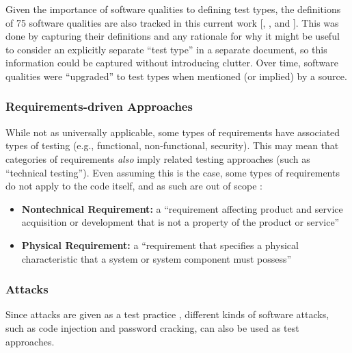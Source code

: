 Given the importance of software qualities to defining test types, the
definitions of 75 software qualities are also tracked in this current work%
[, , and ].
This was done by capturing their definitions and any
rationale for why it might be useful to consider an explicitly separate
``test type'' in a separate document, so this information could be captured
without introducing clutter. Over time, software qualities were ``upgraded''
to test types when mentioned (or implied) by a source.

\subsubsection{Requirements-driven Approaches}
While not as universally applicable, some types of requirements have associated
types of testing (e.g., functional, non-functional, security). This may mean
that categories of requirements \emph{also} imply related testing approaches
(such as ``technical testing''). \ifnotpaper Even assuming this is the case, some types of
      requirements do not apply to the code itself, and as such are out of scope%
      :

      \begin{itemize}
            \item \textbf{Nontechnical Requirement:} a ``requirement affecting product
                  and service acquisition or development that is not a property of
                  the product or service'' \citep[p.~293]{IEEE2017}
            \item \textbf{Physical Requirement:} a ``requirement that specifies a
                  physical characteristic that a system or system component must
                  possess'' \citep[p.~322]{IEEE2017}
      \end{itemize}
\fi

\subsubsection{Attacks}
\label{attacks}
Since attacks are given as a test practice \citep[p.~34]{IEEE2022}, different
kinds of software attacks, such as code injection and password cracking, can
also be used as test approaches.
